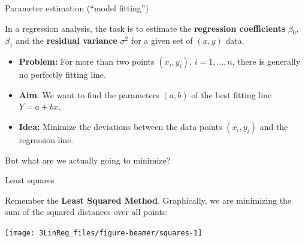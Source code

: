 \documentclass[
  10pt,
  ignorenonframetext,
]{beamer}
\providecommand{\tightlist}{%
  \setlength{\itemsep}{0pt}\setlength{\parskip}{0pt}}
\begin{document}
\begin{frame}
\begin{block}{Parameter estimation (``model fitting'')}
\protect\hypertarget{parameter-estimation-model-fitting}{}
\vspace{2mm}

In a regression analysis, the task is to estimate the \textbf{regression
coefficients} \(\beta_0\), \(\beta_1\) and the \textbf{residual
variance} \(\sigma^2\) for a given set of \((x,y)\) data.

\vspace{4mm}

\begin{itemize}
\item
  \textbf{Problem:} For more than two points \((x_i,y_i)\),
  \(i=1,\ldots, n\), there is generally no perfectly fitting line.
  \vspace{2mm}
\item
  \textbf{Aim}: We want to find the parameters \((a,b)\) of the best
  fitting line \(Y = a + b x\).
\end{itemize}

\vspace{2mm}

\begin{itemize}
\tightlist
\item
  \textbf{Idea:} Minimize the deviations between the data points
  \((x_i,y_i)\) and the regression line.
\end{itemize}

\vspace{4mm}

But what are we actually going to minimize?
\end{block}
\end{frame}

\begin{frame}
\begin{block}{Least squares}
\protect\hypertarget{least-squares}{}
\vspace{2mm}

Remember the \textbf{Least Squared Method}. Graphically, we are
minimizing the sum of the squared distances over all points:

\vspace{4mm}

\begin{center}\texttt{[image: 3LinReg\_files/figure-beamer/squares-1]} \end{center}
\end{block}
\end{frame}
\end{document}
